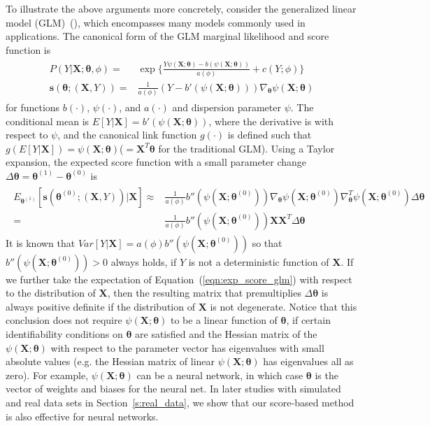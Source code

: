\documentclass[twoside,11pt]{article}
\begin{document}
To illustrate the above arguments more concretely, consider the generalized linear model (GLM)~(\cite{nelder1972generalized}), which encompasses many models commonly used in applications. The canonical form of the GLM marginal likelihood and score function is
\begin{align}
\begin{aligned}
P(Y|\bm{X};\bm { \theta}, \phi) =& \exp\{\frac{Y \psi(\bm{X};\bm { \theta})-b( \psi(\bm{X};\bm { \theta}))}{ a ( \phi)} + c(Y; \phi)\} \\
\bm {s}(\bm { \theta};(\bm {X}, Y)) =& \frac{1}{a( \phi)}(Y - b'( \psi (\bm{X};\bm { \theta} )))\nabla _{ \bm { \theta}} \psi(\bm{X};\bm { \theta} )
\end{aligned}
\label{eqn:score_glm}
\end{align}
for functions $b(\cdot)$, $ \psi(\cdot)$, and $a(\cdot)$ and dispersion parameter $\psi$. The conditional mean is $E[Y|\bm{X}]=b'(\psi(\bm{X};\bm{\theta}))$, where the derivative is with respect to $\psi$, and the canonical link function $g(\cdot)$ is defined such that $g(E[Y|\bm{X}])=\psi(\bm{X};\bm{\theta})$($=\bm{X}^T\bm{\theta}$ for the traditional GLM). Using a Taylor expansion, the expected score function with a small parameter change $ \Delta \bm { \theta}= \bm { \theta}^{(1)}-\bm { \theta}^{(0)}$ is
\begin{align}
\begin{aligned}
E _{\bm { \theta} ^{(1)}}[\bm {s}(\bm { \theta} ^{(0)};(\bm {X}, Y))|\bm{X}] \approx& \frac{1}{a ( \phi)}b''( \psi(\bm{X}; \bm { \theta} ^{(0)}))\nabla _{ \bm { \theta}} \psi (\bm{X}; \bm { \theta} ^{ (0)}) \nabla _{\bm { \theta}}^T \psi (\bm{X}; \bm { \theta} ^{ (0)}) \Delta \bm { \theta} \\
=& \frac{1}{a ( \phi)}b''( \psi(\bm{X}; \bm { \theta} ^{(0)}))\bm {X}\bm {X}^T \Delta \bm { \theta}
\end{aligned}
\label{eqn:exp_score_glm}
\end{align}
It is known that $Var[Y|\bm{X}] = a ( \phi)b''(\psi (\bm{X}; \bm { \theta} ^{ (0)}))$ so that $b''(\psi (\bm{X}; \bm { \theta} ^{ (0)}))>0$ always holds, if $Y$ is not a deterministic function of $\bm{X}$. If we further take the expectation of Equation~(\ref{eqn:exp_score_glm}) with respect to the distribution of $\bm{X}$, then the resulting matrix that premultiplies $\Delta\bm{\theta}$ is always positive definite if the distribution of $\bm{X}$ is not degenerate. Notice that this conclusion does not require $ \psi (\bm{X}; \bm { \theta})$ to be a linear function of $\bm { \theta}$, if certain identifiability conditions on $\bm{\theta}$ are satisfied and the Hessian matrix of the $\psi(\bm{X};\bm{\theta})$ with respect to the parameter vector has eigenvalues with small absolute values (e.g. the Hessian matrix of linear $\psi(\bm{X};\bm{\theta})$ has eigenvalues all as zero). For example, $ \psi (\bm{X}; \bm { \theta})$ can be a neural network, in which case $\bm { \theta}$ is the vector of weights and biases for the neural net. In later studies with simulated and real data sets in Section~\ref{s:real_data}, we show that our score-based method is also effective for neural networks.
\end{document}
